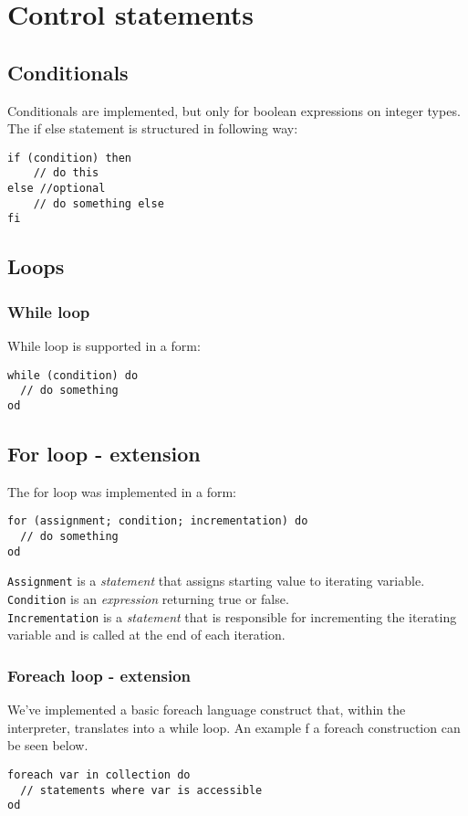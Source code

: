 \documentclass[10pt]{scrartcl}
\begin{document}
\section{Control statements}
\subsection{Conditionals}
Conditionals are implemented, but only for boolean expressions on integer types. The if else statement is structured in following way:
\begin{lstlisting}
if (condition) then
	// do this
else //optional
	// do something else
fi
\end{lstlisting}
\subsection{Loops}
\subsubsection{While loop}
While loop is supported in a form:
\begin{lstlisting}
while (condition) do
  // do something
od
\end{lstlisting}	
\subsection{For loop - extension}
The for loop was implemented in a form:
\begin{lstlisting}
for (assignment; condition; incrementation) do
  // do something
od
\end{lstlisting}	
\texttt{Assignment} is a \emph{statement} that assigns starting value to iterating variable. \\
\texttt{Condition} is an \emph{expression} returning true or false. \\
\texttt{Incrementation} is a \emph{statement} that is responsible for incrementing the iterating variable and is called at the end of each iteration.
\subsubsection{Foreach loop - extension}
We've implemented a basic foreach language construct that, within the interpreter, translates into a while loop. An example f a foreach construction can be seen below.
  \begin{lstlisting}
foreach var in collection do
  // statements where var is accessible
od
\end{lstlisting}
\end{document}
